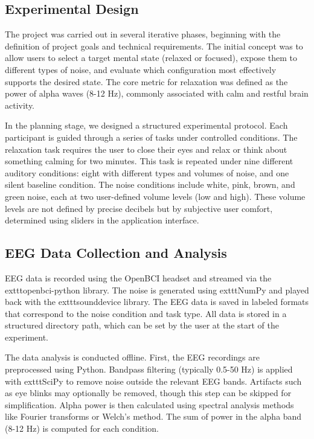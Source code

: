 \subsection{Experimental Design}

The project was carried out in several iterative phases, beginning with the definition of project goals and technical requirements. The initial concept was to allow users to select a target mental state (relaxed or focused), expose them to different types of noise, and evaluate which configuration most effectively supports the desired state. The core metric for relaxation was defined as the power of alpha waves (8-12 Hz), commonly associated with calm and restful brain activity.

In the planning stage, we designed a structured experimental protocol. Each participant is guided through a series of tasks under controlled conditions. The relaxation task requires the user to close their eyes and relax or think about something calming for two minutes. This task is repeated under nine different auditory conditions: eight with different types and volumes of noise, and one silent baseline condition. The noise conditions include white, pink, brown, and green noise, each at two user-defined volume levels (low and high). These volume levels are not defined by precise decibels but by subjective user comfort, determined using sliders in the application interface.

\subsection{EEG Data Collection and Analysis}

EEG data is recorded using the OpenBCI headset and streamed via the 	exttt{openbci-python} library. The noise is generated using 	exttt{NumPy} and played back with the 	exttt{sounddevice} library. The EEG data is saved in labeled formats that correspond to the noise condition and task type. All data is stored in a structured directory path, which can be set by the user at the start of the experiment.

The data analysis is conducted offline. First, the EEG recordings are preprocessed using Python. Bandpass filtering (typically 0.5-50 Hz) is applied with 	exttt{SciPy} to remove noise outside the relevant EEG bands. Artifacts such as eye blinks may optionally be removed, though this step can be skipped for simplification. Alpha power is then calculated using spectral analysis methods like Fourier transforms or Welch’s method. The sum of power in the alpha band (8-12 Hz) is computed for each condition.

